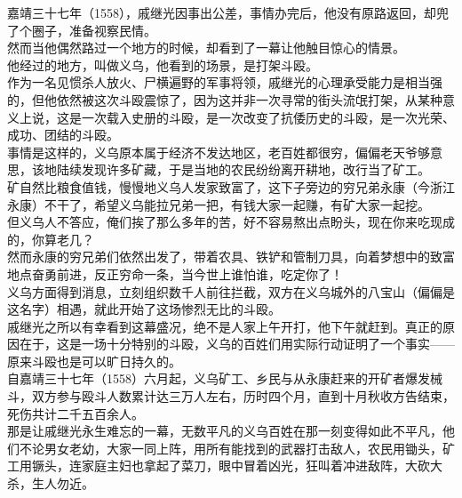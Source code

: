 \begin{multicols}{\theparacolNo}
嘉靖三十七年（1558），戚继光因事出公差，事情办完后，他没有原路返回，却兜了个圈子，准备视察民情。\\

然而当他偶然路过一个地方的时候，却看到了一幕让他触目惊心的情景。\\

他经过的地方，叫做义乌，他看到的场景，是打架斗殴。\\

作为一名见惯杀人放火、尸横遍野的军事将领，戚继光的心理承受能力是相当强的，但他依然被这次斗殴震惊了，因为这并非一次寻常的街头流氓打架，从某种意义上说，这是一次载入史册的斗殴，是一次改变了抗倭历史的斗殴，是一次光荣、成功、团结的斗殴。\\

事情是这样的，义乌原本属于经济不发达地区，老百姓都很穷，偏偏老天爷够意思，该地陆续发现许多矿藏，于是当地的农民纷纷离开耕地，改行当了矿工。\\

矿自然比粮食值钱，慢慢地义乌人发家致富了，这下子旁边的穷兄弟永康（今浙江永康）不干了，希望义乌能拉兄弟一把，有钱大家一起赚，有矿大家一起挖。\\

但义乌人不答应，俺们挨了那么多年的苦，好不容易熬出点盼头，现在你来吃现成的，你算老几？\\

然而永康的穷兄弟们依然出发了，带着农具、铁铲和管制刀具，向着梦想中的致富地点奋勇前进，反正穷命一条，当今世上谁怕谁，吃定你了！\\

义乌方面得到消息，立刻组织数千人前往拦截，双方在义乌城外的八宝山（偏偏是这名字）相遇，就此开始了这场惨烈无比的斗殴。\\

戚继光之所以有幸看到这幕盛况，绝不是人家上午开打，他下午就赶到。真正的原因在于，这是一场十分特别的斗殴，义乌的百姓们用实际行动证明了一个事实——原来斗殴也是可以旷日持久的。\\

自嘉靖三十七年（1558）六月起，义乌矿工、乡民与从永康赶来的开矿者爆发械斗，双方参与殴斗人数累计达三万人左右，历时四个月，直到十月秋收方告结束，死伤共计二千五百余人。\\

那是让戚继光永生难忘的一幕，无数平凡的义乌百姓在那一刻变得如此不平凡，他们不论男女老幼，大家一同上阵，用所有能找到的武器打击敌人，农民用锄头，矿工用镢头，连家庭主妇也拿起了菜刀，眼中冒着凶光，狂叫着冲进敌阵，大砍大杀，生人勿近。\\


\end{multicols}

